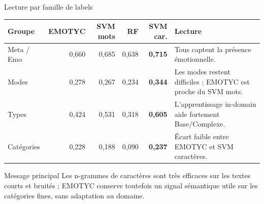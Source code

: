 \documentclass[aspectratio=169]{beamer}
\newcommand{\best}[1]{\textbf{\color{accent}#1}}
\begin{document}
\begin{frame}{Lecture par famille de labels}
  \begin{table}
  \small
  \begin{tabularx}{\textwidth}{lrrrrX}
    \toprule
    \textbf{Groupe} & \textbf{EMOTYC} & \textbf{SVM mots} & \textbf{RF} & \textbf{SVM car.} & \textbf{Lecture} \\
    \midrule
    Meta / Emo & 0,660 & 0,685 & 0,638 & \best{0,715} & Tous captent la présence émotionnelle. \\
    Modes & 0,278 & 0,267 & 0,234 & \best{0,344} & Les modes restent difficiles ; EMOTYC est proche du SVM mots. \\
    Types & 0,424 & 0,531 & 0,318 & \best{0,605} & L'apprentissage in-domain aide fortement Base/Complexe. \\
    Catégories & 0,228 & 0,188 & 0,090 & \best{0,237} & Écart faible entre EMOTYC et SVM caractères. \\
    \bottomrule
  \end{tabularx}
  \end{table}

  \begin{block}{Message principal}
    Les n-grammes de caractères sont très efficaces sur les textes courts et bruités ; EMOTYC conserve toutefois un signal sémantique utile sur les catégories fines, sans adaptation au domaine.
  \end{block}
\end{frame}
\end{document}
